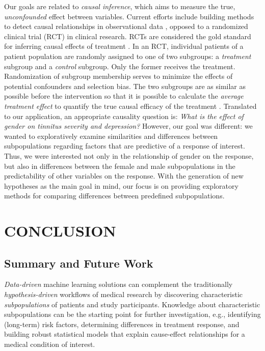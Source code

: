 \documentclass[
  oneside]{book}
\begin{document}
Our goals are related to \emph{causal inference}, which aims to measure the true, \emph{unconfounded} effect between variables.
Current efforts include building methods to detect causal relationships in observational data \autocite{Pearl:BookOfWhy2018,scholkopf2019causality}, opposed to a randomized clinical trial (RCT) in clinical research.
RCTs are considered the gold standard for inferring causal effects of treatment \autocite{hariton2018}.
In an RCT, individual patients of a patient population are randomly assigned to one of two subgroups: a \emph{treatment} subgroup and a \emph{control} subgroup.
Only the former receives the treatment.
Randomization of subgroup membership serves to minimize the effects of potential confounders and selection bias.
The two subgroups are as similar as possible before the intervention so that it is possible to calculate the \emph{average treatment effect} to quantify the true causal efficacy of the treatment \autocite{Hernan:CausalityBook2020}.
Translated to our application, an appropriate causality question is: \emph{What is the effect of gender on tinnitus severity and depression?}
However, our goal was different: we wanted to exploratively examine similarities and differences between subpopulations regarding factors that are predictive of a response of interest.
Thus, we were interested not only in the relationship of gender on the response, but also in differences between the female and male subpopulations in the predictability of other variables on the response.
With the generation of new hypotheses as the main goal in mind, our focus is on providing exploratory methods for comparing differences between predefined subpopulations.

\hypertarget{part-conclusion}{%
\part{CONCLUSION}\label{part-conclusion}}

\hypertarget{conclusion}{%
\chapter{Summary and Future Work}\label{conclusion}}

\emph{Data-driven} machine learning solutions can complement the traditionally \emph{hypothesis-driven} workflows of medical research by discovering characteristic \emph{subpopulations} of patients and study participants.
Knowledge about characteristic subpopulations can be the starting point for further investigation, e.g., identifying (long-term) risk factors, determining differences in treatment response, and building robust statistical models that explain cause-effect relationships for a medical condition of interest.
\end{document}
